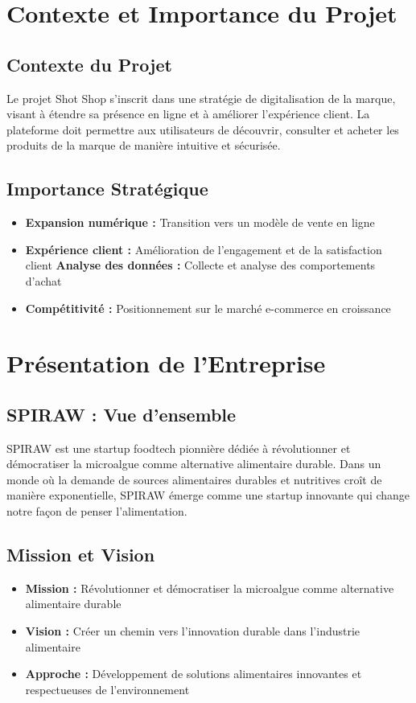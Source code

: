 \documentclass[12pt,a4paper]{article}
\begin{document}
\section{Contexte et Importance du Projet}

\subsection{Contexte du Projet}
Le projet Shot Shop s'inscrit dans une stratégie de digitalisation de la marque, visant à étendre sa présence en ligne et à améliorer l'expérience client. La plateforme doit permettre aux utilisateurs de découvrir, consulter et acheter les produits de la marque de manière intuitive et sécurisée.

\subsection{Importance Stratégique}
\begin{itemize}
    \item \textbf{Expansion numérique :} Transition vers un modèle de vente en ligne
    \item \textbf{Expérience client :} Amélioration de l'engagement et de la satisfaction client
    \textbf{Analyse des données :} Collecte et analyse des comportements d'achat
    \item \textbf{Compétitivité :} Positionnement sur le marché e-commerce en croissance
\end{itemize}

\section{Présentation de l'Entreprise}

\subsection{SPIRAW : Vue d'ensemble}
SPIRAW est une startup foodtech pionnière dédiée à révolutionner et démocratiser la microalgue comme alternative alimentaire durable. Dans un monde où la demande de sources alimentaires durables et nutritives croît de manière exponentielle, SPIRAW émerge comme une startup innovante qui change notre façon de penser l'alimentation.

\subsection{Mission et Vision}
\begin{itemize}
    \item \textbf{Mission :} Révolutionner et démocratiser la microalgue comme alternative alimentaire durable
    \item \textbf{Vision :} Créer un chemin vers l'innovation durable dans l'industrie alimentaire
    \item \textbf{Approche :} Développement de solutions alimentaires innovantes et respectueuses de l'environnement
\end{itemize}
\end{document}
